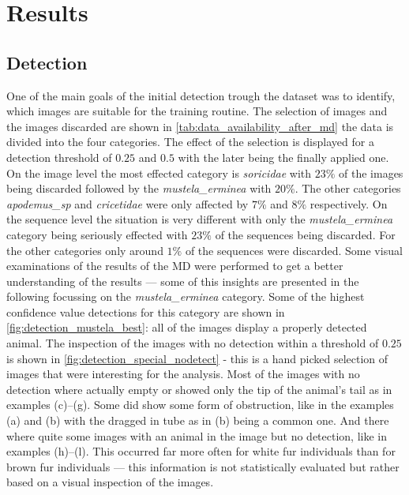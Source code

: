 

\section{Results}
\label{results}

    \subsection{Detection}
    One of the main goals of the initial detection trough the dataset was to identify, which images are suitable for the training routine.
    The selection of images and the images discarded are shown in \autoref{tab:data_availability_after_md} the data is divided into the four categories.
    The effect of the selection is displayed for a detection threshold of \(0.25\) and \(0.5\) with the later being the finally applied one.
    On the image level the most effected category is \textit{soricidae} with \(23\%\) of the images being discarded followed by the \textit{mustela\_erminea} with \(20\%\).
    The other categories \textit{apodemus\_sp} and \textit{cricetidae} were only affected by \(7\%\) and \(8\%\) respectively.
    On the sequence level the situation is very different with only the \textit{mustela\_erminea} category being seriously effected with \(23\%\) of the sequences being discarded.
    For the other categories only around \(1\%\) of the sequences were discarded.
    Some visual examinations of the results of the \ac{MD} were performed to get a better understanding of the results --- some of this insights are presented in the following focussing on the \textit{mustela\_erminea} category.
    Some of the highest confidence value detections for this category are shown in \autoref{fig:detection_mustela_best}: all of the images display a properly detected animal.
    The inspection of the images with no detection within a threshold of \(0.25\) is shown in \autoref{fig:detection_special_nodetect} - this is a hand picked selection of images that were interesting for the analysis.
    Most of the images with no detection where actually empty or showed only the tip of the animal's tail as in examples (c)--(g).
    Some did show some form of obstruction, like in the examples (a) and (b) with the dragged in tube as in (b) being a common one.
    And there where quite some images with an animal in the image but no detection, like in examples (h)--(l).
    This occurred far more often for white fur individuals than for brown fur individuals --- this information is not statistically evaluated but rather based on a visual inspection of the images.

